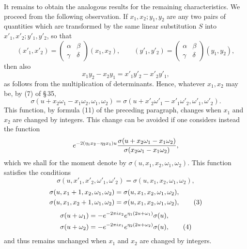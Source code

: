 \documentclass[11pt]{article}
\begin{document}
It remains to obtain the analogous results for the remaining characteristics. We proceed from the following observation. If $x_1,x_2;y_1,y_2$ are any two pairs of quantities which are transformed by the same linear substitution $S$ into $x'_1,x'_2;y'_1,y'_2$, so that
\[
(x'_1,x'_2)=\begin{pmatrix}\alpha&\beta\\\gamma&\delta\end{pmatrix}(x_1,x_2),
\qquad
(y'_1,y'_2)=\begin{pmatrix}\alpha&\beta\\\gamma&\delta\end{pmatrix}(y_1,y_2),
\]
then also
\[
x_1y_2-x_2y_1=x'_1y'_2-x'_2y'_1,
\]
as follows from the multiplication of determinants. Hence, whatever $x_1,x_2$ may be, by (7) of \S\,35,
\begin{equation}
\sigma(u+x_2\omega_1-x_1\omega_2,\omega_1,\omega_2)
=\sigma(u+x'_2\omega'_1-x'_1\omega'_2,\omega'_1,\omega'_2). \tag{1}
\end{equation}
This function, by formula (11) of the preceding paragraph, changes when $x_1$ and $x_2$ are changed by integers. This change can be avoided if one considers instead the function
\[
e^{-2(\eta_1x_2-
\eta_2x_1)u}
{\sigma(u+x_2\omega_1-x_1\omega_2)
\over \sigma(x_2\omega_1-x_1\omega_2)},
\]
which we shall for the moment denote by $\sigma(u,x_1,x_2,\omega_1,
\omega_2)$. This function satisfies the conditions
\begin{equation}
\sigma(u,x'_1,x'_2,\omega'_1,\omega'_2)=\sigma(u,x_1,x_2,\omega_1,
\omega_2), \tag{2}
\end{equation}
\begin{align}
\sigma(u,x_1+1,x_2,\omega_1,
\omega_2)&=\sigma(u,x_1,x_2,
\omega_1,
\omega_2),\notag\\
\sigma(u,x_1,x_2+1,
\omega_1,
\omega_2)&=\sigma(u,x_1,x_2,
\omega_1,
\omega_2), \tag{3}
\end{align}
\begin{align}
\sigma(u+\omega_1)&=-e^{-2\pi i x_2}e^{\eta_1(2u+
\omega_1)}\sigma(u),\notag\\
\sigma(u+\omega_2)&=-e^{-2\pi i x_1}e^{\eta_2(2u+
\omega_2)}\sigma(u), \tag{4}
\end{align}
and thus remains unchanged when $x_1$ and $x_2$ are changed by integers.
\end{document}
